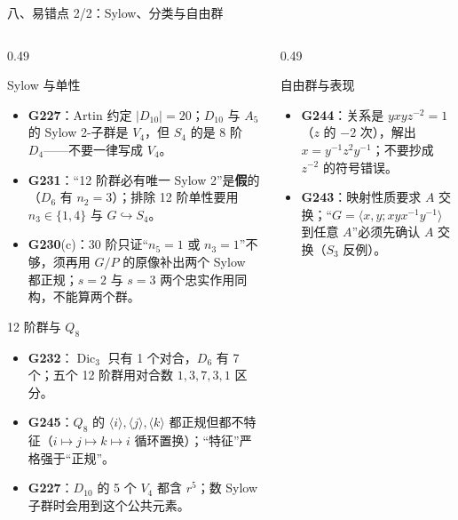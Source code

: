 \documentclass[aspectratio=169,10pt,fontset=none]{ctexbeamer}
\newcommand{\ex}[1]{\textcolor{accent}{\footnotesize\bfseries #1}}
\begin{document}
\begin{frame}[t]{八、易错点 2/2：Sylow、分类与自由群}
  \label{sec:pitfalls2}
  \begin{columns}[T,onlytextwidth]
    \begin{column}{0.49\textwidth}
      \begin{alertblock}{\footnotesize Sylow 与单性}
        \scriptsize
        \begin{itemize}\setlength{\itemsep}{1pt}
          \item \ex{G227}：Artin 约定 $|D_{10}|=20$；$D_{10}$ 与 $A_5$ 的 Sylow 2-子群是 $V_4$，但 $S_4$ 的是 8 阶 $D_4$——不要一律写成 $V_4$。
          \item \ex{G231}：“12 阶群必有唯一 Sylow 2”是\textbf{假}的（$D_6$ 有 $n_2=3$）；排除 12 阶单性要用 $n_3\in\{1,4\}$ 与 $G\hookrightarrow S_4$。
          \item \ex{G230}(c)：30 阶只证“$n_5=1$ 或 $n_3=1$”不够，须再用 $G/P$ 的原像补出两个 Sylow 都正规；$s=2$ 与 $s=3$ 两个忠实作用同构，不能算两个群。
        \end{itemize}
      \end{alertblock}
      \begin{alertblock}{\footnotesize 12 阶群与 $Q_8$}
        \scriptsize
        \begin{itemize}\setlength{\itemsep}{1pt}
          \item \ex{G232}：$\operatorname{Dic}_3$ 只有 1 个对合，$D_6$ 有 7 个；五个 12 阶群用对合数 $1,3,7,3,1$ 区分。
          \item \ex{G245}：$Q_8$ 的 $\langle i\rangle,\langle j\rangle,\langle k\rangle$ 都正规但都不特征（$i\mapsto j\mapsto k\mapsto i$ 循环置换）；“特征”严格强于“正规”。
          \item \ex{G227}：$D_{10}$ 的 5 个 $V_4$ 都含 $r^5$；数 Sylow 子群时会用到这个公共元素。
        \end{itemize}
      \end{alertblock}
    \end{column}
    \begin{column}{0.49\textwidth}
      \begin{alertblock}{\footnotesize 自由群与表现}
        \scriptsize
        \begin{itemize}\setlength{\itemsep}{1pt}
          \item \ex{G244}：关系是 $yxyz^{-2}=1$（$z$ 的 $-2$ 次），解出 $x=y^{-1}z^2y^{-1}$；不要抄成 $z^{-2}$ 的符号错误。
          \item \ex{G243}：映射性质要求 $A$ 交换；“$G=\langle x,y;xyx^{-1}y^{-1}\rangle$ 到任意 $A$”必须先确认 $A$ 交换（$S_3$ 反例）。

\end{itemize}
\end{alertblock}
\end{column}
\end{columns}
\end{frame}
\end{document}
